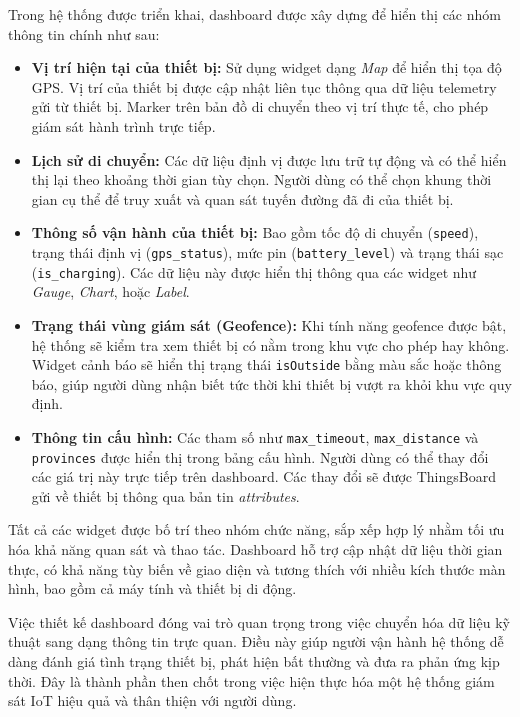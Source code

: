 \documentclass[../DoAn.tex]{subfiles}
\begin{document}
Trong hệ thống được triển khai, dashboard được xây dựng để hiển thị các nhóm thông tin chính như sau:

\begin{itemize}
    \item \textbf{Vị trí hiện tại của thiết bị:} Sử dụng widget dạng \textit{Map} để hiển thị tọa độ GPS. Vị trí của thiết bị được cập nhật liên tục thông qua dữ liệu telemetry gửi từ thiết bị. Marker trên bản đồ di chuyển theo vị trí thực tế, cho phép giám sát hành trình trực tiếp.
    
    \item \textbf{Lịch sử di chuyển:} Các dữ liệu định vị được lưu trữ tự động và có thể hiển thị lại theo khoảng thời gian tùy chọn. Người dùng có thể chọn khung thời gian cụ thể để truy xuất và quan sát tuyến đường đã đi của thiết bị.
    
    \item \textbf{Thông số vận hành của thiết bị:} Bao gồm tốc độ di chuyển (\texttt{speed}), trạng thái định vị (\texttt{gps\_status}), mức pin (\texttt{battery\_level}) và trạng thái sạc (\texttt{is\_charging}). Các dữ liệu này được hiển thị thông qua các widget như \textit{Gauge}, \textit{Chart}, hoặc \textit{Label}.
    
    \item \textbf{Trạng thái vùng giám sát (Geofence):} Khi tính năng geofence được bật, hệ thống sẽ kiểm tra xem thiết bị có nằm trong khu vực cho phép hay không. Widget cảnh báo sẽ hiển thị trạng thái \texttt{isOutside} bằng màu sắc hoặc thông báo, giúp người dùng nhận biết tức thời khi thiết bị vượt ra khỏi khu vực quy định.
    
    \item \textbf{Thông tin cấu hình:} Các tham số như \texttt{max\_timeout}, \texttt{max\_distance} và \texttt{provinces} được hiển thị trong bảng cấu hình. Người dùng có thể thay đổi các giá trị này trực tiếp trên dashboard. Các thay đổi sẽ được ThingsBoard gửi về thiết bị thông qua bản tin \textit{attributes}.
\end{itemize}

Tất cả các widget được bố trí theo nhóm chức năng, sắp xếp hợp lý nhằm tối ưu hóa khả năng quan sát và thao tác. Dashboard hỗ trợ cập nhật dữ liệu thời gian thực, có khả năng tùy biến về giao diện và tương thích với nhiều kích thước màn hình, bao gồm cả máy tính và thiết bị di động.

Việc thiết kế dashboard đóng vai trò quan trọng trong việc chuyển hóa dữ liệu kỹ thuật sang dạng thông tin trực quan. Điều này giúp người vận hành hệ thống dễ dàng đánh giá tình trạng thiết bị, phát hiện bất thường và đưa ra phản ứng kịp thời. Đây là thành phần then chốt trong việc hiện thực hóa một hệ thống giám sát IoT hiệu quả và thân thiện với người dùng.
\end{document}
